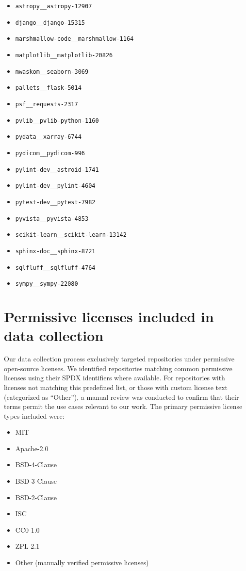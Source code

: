 \documentclass[dandb]{article}
\begin{document}
\begin{itemize}
    \item \texttt{astropy\_\_astropy-12907}
    \item \texttt{django\_\_django-15315}
    \item \texttt{marshmallow-code\_\_marshmallow-1164}
    \item \texttt{matplotlib\_\_matplotlib-20826}
    \item \texttt{mwaskom\_\_seaborn-3069}
    \item \texttt{pallets\_\_flask-5014}
    \item \texttt{psf\_\_requests-2317}
    \item \texttt{pvlib\_\_pvlib-python-1160}
    \item \texttt{pydata\_\_xarray-6744}
    \item \texttt{pydicom\_\_pydicom-996}
    \item \texttt{pylint-dev\_\_astroid-1741}
    \item \texttt{pylint-dev\_\_pylint-4604}
    \item \texttt{pytest-dev\_\_pytest-7982}
    \item \texttt{pyvista\_\_pyvista-4853}
    \item \texttt{scikit-learn\_\_scikit-learn-13142}
    \item \texttt{sphinx-doc\_\_sphinx-8721}
    \item \texttt{sqlfluff\_\_sqlfluff-4764}
    \item \texttt{sympy\_\_sympy-22080}
\end{itemize}

\section{Permissive licenses included in data collection}
\label{appendix:licenses}

Our data collection process exclusively targeted repositories under permissive open-source licenses. We identified repositories matching common permissive licenses using their SPDX identifiers where available. For repositories with licenses not matching this predefined list, or those with custom license text (categorized as ``Other''), a manual review was conducted to confirm that their terms permit the use cases relevant to our work. The primary permissive license types included were:

\begin{itemize}
    \item MIT
    \item Apache-2.0
    \item BSD-4-Clause
    \item BSD-3-Clause
    \item BSD-2-Clause
    \item ISC
    \item CC0-1.0
    \item ZPL-2.1
    \item Other (manually verified permissive licenses)
\end{itemize}
\end{document}
